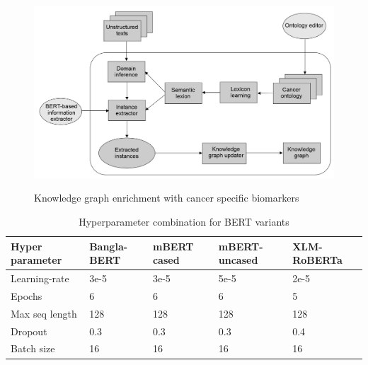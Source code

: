 \begin{figure}[h]
	\centering
		\includegraphics[scale=0.6]{images/KG_enrichment.png}
        \label{fig:kg_enrichment}
	\caption{Knowledge graph enrichment with cancer specific biomarkers}
	\vspace{-2mm}
\end{figure}

\begin{table}
    \centering
    \caption{Hyperparameter combination for BERT variants}
    \label{table:bert_params}
    \begin{tabular}{l|l|l|l|l}
        \hline
         \textbf{Hyper parameter}  & \textbf{Bangla-BERT}  &
         \textbf{mBERT cased} &
         \textbf{mBERT-uncased} & \textbf{XLM-RoBERTa}\\
        \hline
        Learning-rate  & 3e-5  & 3e-5 & 5e-5 & 2e-5 \\
        Epochs & 6 & 6 & 6 & 5 \\
        Max seq length & 128 & 128 & 128 & 128 \\
        Dropout & 0.3 & 0.3 & 0.3 & 0.4 \\
        Batch size & 16 & 16 & 16 & 16 \\
        \hline
    \end{tabular}
\end{table}

